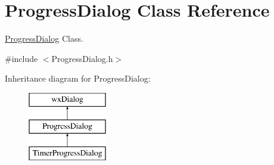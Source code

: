 \hypertarget{class_progress_dialog}{}\section{Progress\+Dialog Class Reference}
\label{class_progress_dialog}


\hyperlink{class_progress_dialog}{Progress\+Dialog} Class.  




{\ttfamily \#include $<$Progress\+Dialog.\+h$>$}

Inheritance diagram for Progress\+Dialog\+:\begin{figure}[H]
\begin{center}
\leavevmode
\includegraphics[height=3.000000cm]{class_progress_dialog}
\end{center}
\end{figure}
